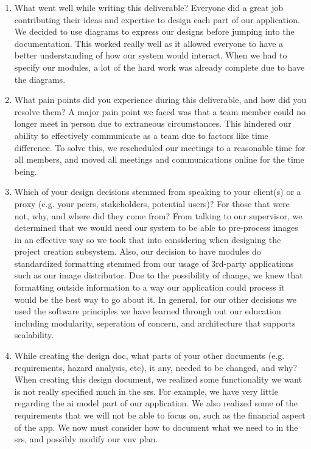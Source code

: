 \documentclass[12pt, titlepage]{article}
\begin{document}
\begin{enumerate}
  \item What went well while writing this deliverable?
  Everyone did a great job contributing their ideas and expertise to design each part of our application. We decided to use diagrams to express our designs before jumping into the documentation. This worked really well as
  it allowed everyone to have a better understanding of how our system would interact. When we had to specify our modules, a lot of the hard work was already complete due to have the diagrams.
  \item What pain points did you experience during this deliverable, and how
    did you resolve them?
    A major pain point we faced was that a team member could no longer meet in person due to extraneous circumstances. This hindered our ability to effectively communicate as a team due to factors like time difference.
    To solve this, we rescheduled our meetings to a reasonable time for all members, and moved all meetings and communications online for the time being.
  \item Which of your design decisions stemmed from speaking to your client(s)
  or a proxy (e.g. your peers, stakeholders, potential users)? For those that
  were not, why, and where did they come from?
  From talking to our supervisor, we determined that we would need our system to be able to pre-process images in an effective way so we took that into considering when designing the project creation subsystem.
  Also, our decision to have modules do standardized formatting stemmed from our usage of 3rd-party applications such as our image distributor. Due to the possibility of change, we knew that formatting outside information to a way our application could process it would be the best way to go about it.
  In general, for our other decisions we used the software principles we have learned through out our education including modularity, seperation of concern, and architecture that supports scalability.
  \item While creating the design doc, what parts of your other documents (e.g.
  requirements, hazard analysis, etc), it any, needed to be changed, and why?
  When creating this design document, we realized some functionality we want is not really specified much in the srs. For example, we have very little regarding the ai model part of our application.
  We also realized some of the requirements that we will not be able to focus on, such as the financial aspect of the app. We now must consider how to document what we need to in the srs, and possibly modify our vnv plan.

\end{enumerate}
\end{document}
